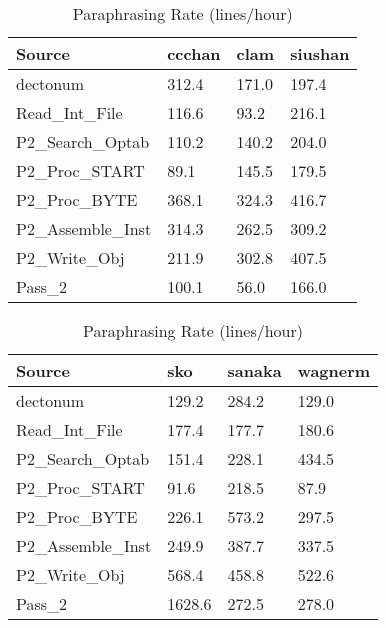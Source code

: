 \begin{table}[hb]
\begin{center}
\begin{tabular}{|l|l|l|l|}
\hline
Source & ccchan & clam & siushan\\
\hline
dectonum & 312.4 & 171.0 & 197.4\\
Read\_Int\_File & 116.6 & 93.2 & 216.1\\
P2\_Search\_Optab & 110.2 & 140.2 & 204.0\\
P2\_Proc\_START & 89.1 & 145.5 & 179.5\\
P2\_Proc\_BYTE & 368.1 & 324.3 & 416.7\\
P2\_Assemble\_Inst & 314.3 & 262.5 & 309.2\\
P2\_Write\_Obj & 211.9 & 302.8 & 407.5\\
Pass\_2 & 100.1 & 56.0 & 166.0\\
\hline
\end{tabular}
\end{center}
\caption{Paraphrasing Rate (lines/hour)}
\end{table}

\begin{table}[hb]
\begin{center}
\begin{tabular}{|l|l|l|l|}
\hline
Source & sko & sanaka & wagnerm\\
\hline
dectonum & 129.2 & 284.2 & 129.0\\
Read\_Int\_File & 177.4 & 177.7 & 180.6\\
P2\_Search\_Optab & 151.4 & 228.1 & 434.5\\
P2\_Proc\_START & 91.6 & 218.5 & 87.9\\
P2\_Proc\_BYTE & 226.1 & 573.2 & 297.5\\
P2\_Assemble\_Inst & 249.9 & 387.7 & 337.5\\
P2\_Write\_Obj & 568.4 & 458.8 & 522.6\\
Pass\_2 & 1628.6 & 272.5 & 278.0\\
\hline
\end{tabular}
\end{center}
\caption{Paraphrasing Rate (lines/hour)}
\end{table}

